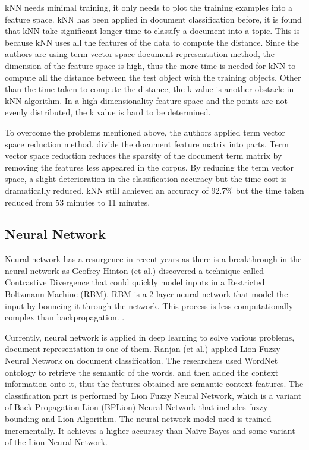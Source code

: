 kNN needs minimal training, it only needs to plot the training examples into a feature space.  
kNN has been applied in document classification before, it is found that kNN take significant 
longer time to classify a document into a topic. This is because kNN uses all the features of the data to compute the distance. Since the authors are using term vector space document 
representation method, the dimension of the feature space is high, thus the more time is needed for kNN to compute all the distance between the test object with the training objects. Other than the time taken to compute the distance, the k value is another obstacle in kNN algorithm. In a high dimensionality feature space and the points are not evenly distributed, the k value is hard to be determined.
	
To overcome the problems mentioned above, the authors applied term vector space reduction method, divide the document feature matrix into parts. Term vector space reduction reduces 
the sparsity of the document term matrix by removing the features less appeared in the corpus. By reducing the term vector space, a slight deterioration in the classification accuracy but the time cost is dramatically reduced. kNN still achieved an accuracy of 92.7\% but the time taken reduced from 53 minutes to 11 minutes. \cite{knnVectorSpaceReduction}

\clearpage
\subsection{Neural Network}
Neural network has a resurgence in recent years as there is a breakthrough in the neural network as Geofrey Hinton (et al.) discovered a technique called Contrastive Divergence that could quickly model inputs in a Restricted Boltzmann Machine (RBM). RBM is a 2-layer neural network that model the input by bouncing it through the network. This process is less computationally complex than backpropagation. \cite{nnHinton}.
	
Currently, neural network is applied in deep learning to solve various problems, document representation is one of them. Ranjan (et al.) applied Lion Fuzzy Neural Network on document 
classification. The researchers used WordNet ontology to retrieve the semantic of the words, 
and then added the context information onto it, thus the features obtained are semantic-context features. The classification part is performed by Lion Fuzzy Neural Network, which is a variant of Back Propagation Lion (BPLion) Neural Network that includes fuzzy bounding and Lion Algorithm. The neural network model used is trained incrementally. It achieves a higher accuracy than Naïve Bayes and some variant of the Lion Neural Network. \cite{lionNn}
	
